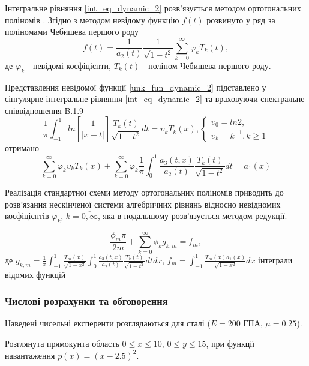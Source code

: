 Інтегральне рівняння \eqref{int_eq_dynamic_2} розв'язується методом ортогональних поліномів \cite{popov_3}.
Згідно з методом невідому функцію $f(t)$ розвинуто у ряд за поліномами Чебишева першого роду
\begin{equation}\label{unk_fun_dynamic_2}
    f(t) = \frac{1}{a_2(t)} \frac{1}{\sqrt{1 - t^2}} \sum_{k=0}^{\infty} \varphi_k T_{k}(t),
\end{equation}
де $\varphi_k$ - невідомі коєфіцієнти, $T_{k}(t)$ - поліном Чебишева першого роду.


Представлення невідомої функції \eqref{unk_fun_dynamic_2} підставлено у сінгулярне інтегральне рівняння \eqref{int_eq_dynamic_2}
та враховуючи спектральне співвідношення B.1.9 \cite{ortogonal}
\begin{equation}
    \frac{1}{\pi} \int_{-1}^{1} ln\left[ \frac{1}{\lvert x - t \rvert} \right] \frac{T_k(t)}{\sqrt{1 - t^2}} dt = \upsilon_k T_k(x),
    \begin{cases}
        \upsilon_0 = ln 2, \\
        \upsilon_k = k^{-1}, k \ge 1
    \end{cases}
\end{equation} 
отримано
\begin{equation}\label{int_eq_2_dynamic_2}
    \sum_{k=0}^{\infty}  \varphi_k \upsilon_k T_{k}( x ) + \sum_{k=0}^{\infty} \varphi_k \frac{1}{\pi} \int_{0}^{1} \frac{a_3(t, x)}{a_2(t)} \frac{T_{k}(t)}{\sqrt{1 - t^2}} dt = a_1(x)
\end{equation}

Реалізація стандартної схеми методу ортогональних поліномів приводить до розв'язання нескінченої системи алгебричних рівнянь відносно невідномих коєфіцієнтів $\varphi_k$, $k=\overline{0, \infty}$,
яка в подальшому розв'язується методом редукції.

\begin{equation}\label{int_system_dynamic_2}
    \frac{\phi_m \pi}{2m} + \sum_{k=0}^{\infty} \phi_k g_{k, m} = f_m,
\end{equation}
де $g_{k, m} = \frac{1}{\pi} \int_{-1}^{1} \frac{T_{m}(x)}{\sqrt{1 - x^2}} \int_{0}^{1} \frac{a_3(t, x )}{a_2(t)} \frac{T_{k}(t)}{\sqrt{1 - t^2}} dt dx$,
$f_m = \int_{-1}^{1} \frac{T_{m}(x) a_1(x)}{\sqrt{1 - x^2}} dx$ інтеграли відомих функцій

\subsubsection{Числові розрахунки та обговорення}
Наведені чисельні експеренти розглядаються для сталі ($E=200$ ГПА, $\mu=0.25$).

Розглянута прямокунта область $0 \le x \le 10$, $0 \le y \le 15$, при функції навантаження $p(x)=(x-2.5)^2$.
